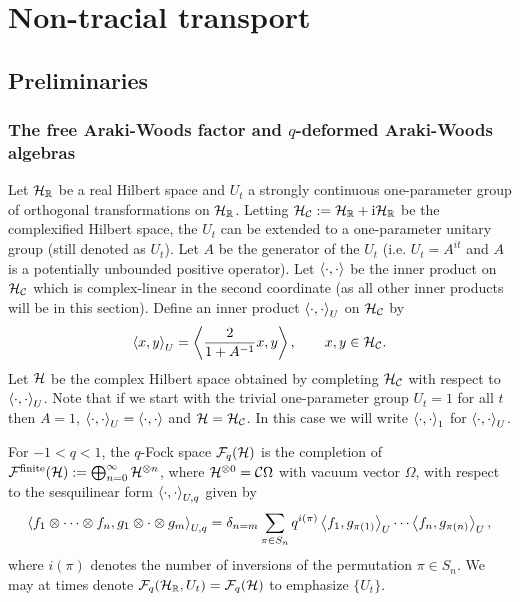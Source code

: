 
%
%

\chapter{Non-tracial transport}\label{non-tracial transport chapter}


\section{Preliminaries}\label{prelim}



\subsection{The free Araki-Woods factor and $q$-deformed Araki-Woods algebras}\label{free_Araki-Woods}

Let $\mathcal H_{\mathbb{R}}$ be a real Hilbert space and $U_t$ a strongly continuous one-parameter group of orthogonal transformations on $\mathcal H_{\mathbb{R}}$. Letting $\mathcal H_\mathcal C:=\mathcal H_{\mathbb{R}} +\text{i} \mathcal H_{\mathbb{R}}$ be the complexified Hilbert space, the $U_t$ can be extended to a one-parameter unitary group (still denoted as $U_t$). Let $A$ be the generator of the $U_t$ (i.e. $U_t=A^{it}$ and $A$ is a potentially unbounded positive operator). Let $\left\langle\cdot,\cdot\right\rangle$ be the inner product on $\mathcal H_\mathcal C$ which is complex-linear in the second coordinate (as all other inner products will be in this section). Define an inner product $\left\langle\cdot,\cdot\right\rangle_U$ on $\mathcal H_\mathcal C$ by
	\begin{align*}
		\left\langle x,y\right\rangle_U  = \left\langle \frac{2}{1+A^{-1}}x, y\right\rangle,\qquad x,y\in\mathcal H_\mathcal C.
	\end{align*}
Let $\mathcal H$ be the complex Hilbert space obtained by completing $\mathcal H_\mathcal C$ with respect to $\left\langle\cdot,\cdot\right\rangle_U$. Note that if we start with the trivial one-parameter group $U_t=1$ for all $t$ then $A=1$, $\left\langle\cdot,\cdot\right\rangle_U=\left\langle\cdot,\cdot\right\rangle$ and $\mathcal H=\mathcal H_\mathcal C$. In this case we will write $\left\langle\cdot,\cdot\right\rangle_1$ for $\left\langle\cdot,\cdot\right\rangle_U$.\par
For $-1<q<1$, the $q$-Fock space $\mathcal{F}_q(\mathcal H)$ is the completion of $\mathcal{F}^{\text{finite}}(\mathcal H):=\bigoplus_{n=0}^\infty \mathcal H^{\otimes n}$, where $\mathcal H^{\otimes 0}=\mathcal C\Omega$ with vacuum vector $\Omega$, with respect to the sesquilinear form $\left\langle\cdot,\cdot\right\rangle_{U,q}$ given by
	\begin{align*}
		\left\langle f_1\otimes\cdots\otimes f_n, g_1\otimes\cdot\otimes g_m\right\rangle_{U,q} = \delta_{n=m} \sum_{\pi\in S_n} q^{i(\pi)} \left\langle f_1,g_{\pi(1)}\right\rangle_U\cdots \left\langle f_n,g_{\pi(n)}\right\rangle_U,
	\end{align*}
where $i(\pi)$ denotes the number of inversions of the permutation $\pi\in S_n$. We may at times denote $\mathcal{F}_q(\mathcal H_{\mathbb{R}},U_t)=\mathcal{F}_q(\mathcal H)$ to emphasize $\{U_t\}$.

